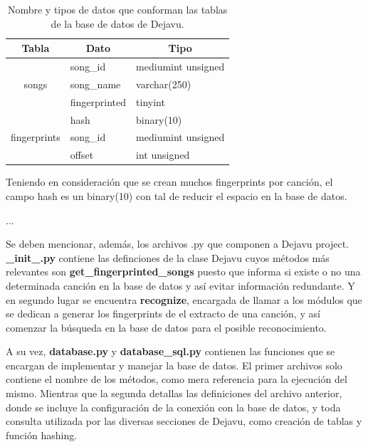 \FloatBarrier
\begin{table}[h!]
\centering
\caption{Nombre y tipos de datos que conforman las tablas de la base de datos de Dejavu.}
\label{tab:TablasDejavu}
\begin{tabular}{@{}cll@{}}
\toprule
\midrule
Tabla                         & \multicolumn{1}{c}{Dato} & \multicolumn{1}{c}{Tipo} \\ \midrule
\multirow{3}{*}{songs \vspace{1em}}        & song\_id                 & mediumint unsigned       \\
                              & song\_name               & varchar(250)             \\ \midrule
                              & fingerprinted            & tinyint                  \\
\multirow{3}{*}{fingerprints \vspace{1em}} & hash                     & binary(10)               \\
                              & song\_id                 & mediumint unsigned       \\
                              & offset                   & int unsigned             \\ \midrule \bottomrule 
\end{tabular}
\end{table}


Teniendo en consideración que se crean muchos fingerprints por canción, el campo hash es un binary(10) con tal de reducir el espacio en la base de datos.

...


Se deben mencionar, además, los archivos .py que componen a Dejavu project. \textbf{\_init\_.py} contiene las definciones de la clase Dejavu cuyos métodos más relevantes son \textbf{get\_fingerprinted\_songs} puesto que informa si existe o no una determinada canción en la base de datos y así evitar información redundante. Y en segundo lugar se encuentra \textbf{recognize}, encargada de llamar a los módulos que se dedican a generar los fingerprints de el extracto de una canción, y así comenzar la búsqueda en la base de datos para el posible reconocimiento.

A su vez, \textbf{database.py} y \textbf{database\_sql.py} contienen las funciones que se encargan de implementar y manejar la base de datos. El primer archivos solo contiene el nombre de los métodos, como mera referencia para la ejecución del mismo. Mientras que la segunda detallas las definiciones del archivo anterior, donde se incluye la configuración de la conexión con la base de datos, y toda consulta utilizada por las diversas secciones de Dejavu, como creación de tablas y función hashing.

